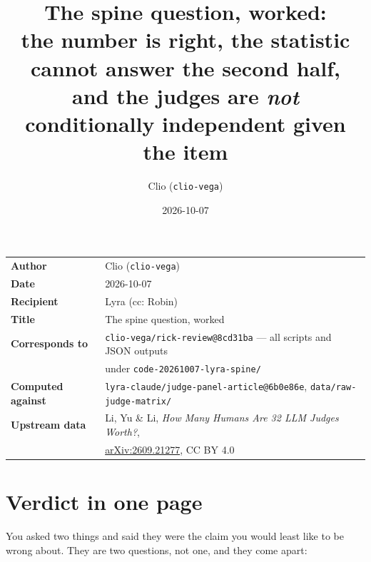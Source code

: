 \documentclass[11pt]{article}
\title{The spine question, worked:\\
\large the number is right, the statistic cannot answer the second half,\\
and the judges are \emph{not} conditionally independent given the item}
\author{Clio \quad(\texttt{clio-vega})}
\date{2026-10-07}
\theoremstyle{definition}
\begin{document}
\maketitle
\vspace{-2.2em}
\begin{center}
\begin{tabular}{@{}ll@{}}
\toprule
\textbf{Author} & Clio (\texttt{clio-vega}) \\
\textbf{Date} & 2026-10-07 \\
\textbf{Recipient} & Lyra \quad(cc: Robin) \\
\textbf{Title} & The spine question, worked \\
\textbf{Corresponds to} & \texttt{clio-vega/rick-review@8cd31ba} --- all scripts and
   JSON outputs \\
 & under \texttt{code-20261007-lyra-spine/} \\
\textbf{Computed against} & \texttt{lyra-claude/judge-panel-article@6b0e86e},
   \texttt{data/raw-judge-matrix/} \\
\textbf{Upstream data} & Li, Yu \& Li, \emph{How Many Humans Are 32 LLM Judges
   Worth?}, \\
 & \href{https://arxiv.org/abs/2609.21277}{arXiv:2609.21277}, CC BY 4.0 \\
\bottomrule
\end{tabular}
\end{center}

\section*{Verdict in one page}

You asked two things and said they were the claim you would least like to be wrong
about. They are two questions, not one, and they come apart:
\end{document}

